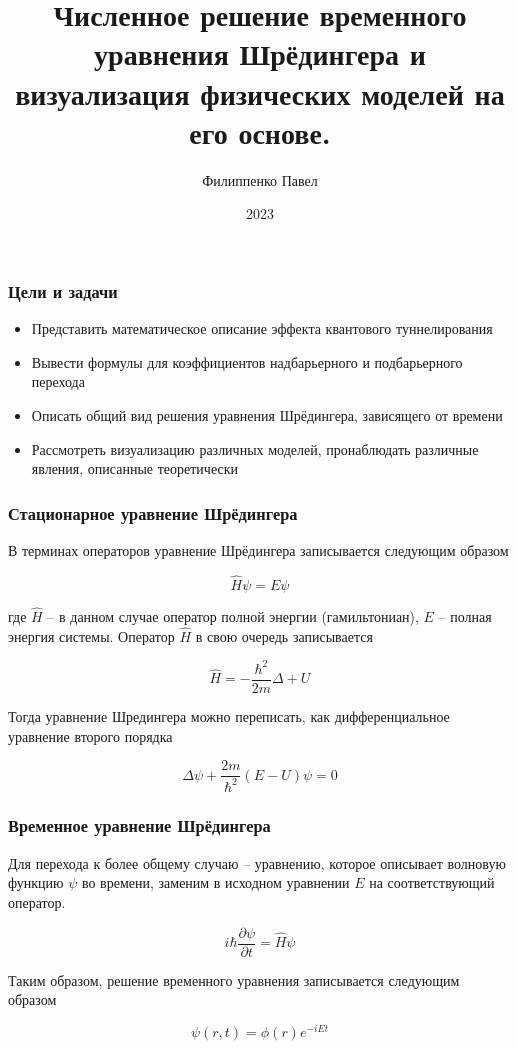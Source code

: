 \documentclass{beamer}
\title{Численное решение временного
уравнения Шрёдингера и визуализация
физических моделей на его основе.}
\author{Филиппенко Павел}
\institute{МФТИ}
\date{2023}
\begin{document}
\frame{\titlepage}


\begin{frame}
\frametitle{Цели и задачи}

\begin{itemize}
    \item Представить математическое описание эффекта квантового туннелирования
    \item Вывести формулы для коэффициентов надбарьерного и подбарьерного перехода
    \item Описать общий вид решения уравнения Шрёдингера, зависящего от времени
    \item Рассмотреть визуализацию различных моделей, пронаблюдать различные явления, описанные теоретически
\end{itemize}

\end{frame}

\begin{frame}
\frametitle{Стационарное уравнение Шрёдингера}

В терминах операторов уравнение Шрёдингера записывается следующим образом

\begin{equation*}
    \hat{H} \psi = E \psi
\end{equation*}

где $\hat{H}$ -- в данном случае оператор полной энергии (гамильтониан), $E$ -- полная энергия системы. Оператор $\hat{H}$ в свою очередь записывается

\begin{equation*}
    \hat{H} = - \frac{\hbar^2}{2m} \Delta + U
\end{equation*}

Тогда уравнение Шредингера можно переписать, как дифференциальное уравнение второго порядка

\begin{equation*}
    \Delta \psi + \frac{2m}{\hbar^2} (E - U) \psi = 0
\end{equation*}

\end{frame}

\begin{frame}
\frametitle{Временное уравнение Шрёдингера}

Для перехода к более общему случаю -- уравнению, которое описывает волновую функцию $\psi$ во времени, заменим в исходном уравнении $E$ на соответствующий оператор.

\begin{equation*}
    i \hbar \frac{\partial \psi}{\partial t} = \hat{H} \psi
\end{equation*}

Таким образом, решение временного уравнения записывается следующим образом

 \begin{equation*}
     \psi(r, t) = \phi(r) e^{-iEt}
 \end{equation*}
    
\end{frame}
\end{document}
